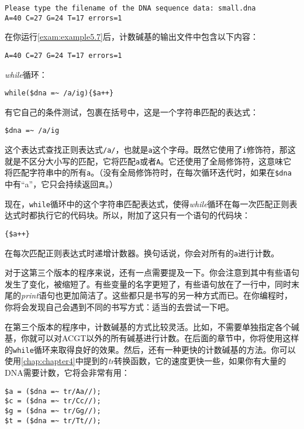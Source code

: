\begin{lstlisting}
Please type the filename of the DNA sequence data: small.dna
A=40 C=27 G=24 T=17 errors=1
\end{lstlisting}

在你运行\autoref{exam:example5.7}后，计数碱基的输出文件中包含以下内容：

\begin{lstlisting}
A=40 C=27 G=24 T=17 errors=1
\end{lstlisting}

\textit{while}循环：

\begin{lstlisting}
while($dna =~ /a/ig){$a++} 
\end{lstlisting}

有它自己的条件测试，包裹在括号中，这是一个字符串匹配的表达式：

\begin{lstlisting}
$dna =~ /a/ig 
\end{lstlisting}

这个表达式查找正则表达式\verb|/a/|，也就是\verb|a|这个字母。既然它使用了\verb|i|修饰符，那这就是不区分大小写的匹配，它将匹配\verb|a|或者\verb|A|。它还使用了全局修饰符，这意味它将匹配字符串中的所有\verb|a|。（没有全局修饰符时，在每次循环迭代时，如果在\verb|$dna|中有“a”，它只会持续返回\verb|真|。）

现在，\verb|while|循环中的这个字符串匹配表达式，使得\textit{while}循环在每一次匹配正则表达式时都执行它的代码块。所以，附加了这只有一个语句的代码块：

\begin{lstlisting}
{$a++}
\end{lstlisting}

在每次匹配正则表达式时递增计数器。换句话说，你会对所有的\verb|a|进行计数。

对于这第三个版本的程序来说，还有一点需要提及一下。你会注意到其中有些语句发生了变化，被缩短了。有些变量的名字更短了，有些语句放在了一行中，同时末尾的\textit{print}语句也更加简洁了。这些都只是书写的另一种方式而已。在你编程时，你将会发现自己会遇到不同的书写方式：适当的去尝试一下吧。

在第三个版本的程序中，计数碱基的方式比较灵活。比如，不需要单独指定各个碱基，你就可以对ACGT以外的所有碱基进行计数。在后面的章节中，你将使用这样的\verb|while|循环来取得良好的效果。然后，还有一种更快的计数碱基的方法。你可以使用\autoref{chap:chapter4}中提到的\textit{tr}转换函数，它的速度更快一些，如果你有大量的DNA需要计数，它将会非常有用：

\begin{lstlisting}
$a = ($dna =~ tr/Aa//);
$c = ($dna =~ tr/Cc//);
$g = ($dna =~ tr/Gg//);
$t = ($dna =~ tr/Tt//);
\end{lstlisting}

